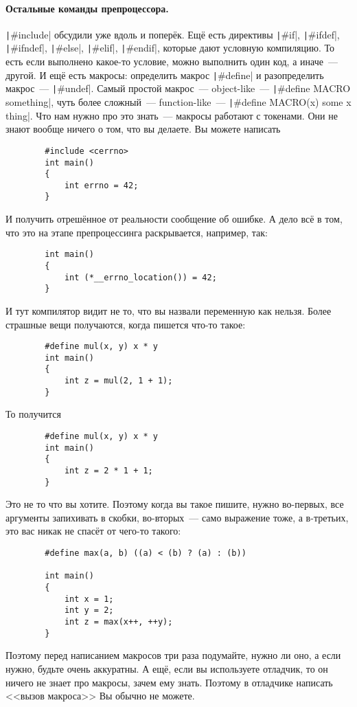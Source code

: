 \documentclass{article}
\begin{document}
    \paragraph{Остальные команды препроцессора.}
    \texttt|#include| обсудили уже вдоль и поперёк. Ещё есть директивы \texttt|#if|, \texttt|#ifdef|, \texttt|#ifndef|, \texttt|#else|, \texttt|#elif|, \texttt|#endif|, которые дают условную компиляцию. То есть если выполнено какое-то условие, можно выполнить один код, а иначе~--- другой. И ещё есть макросы: определить макрос \texttt|#define| и разопределить макрос~--- \texttt|#undef|. Самый простой макрос~--- object-like~--- \texttt|#define MACRO something|, чуть более сложный~--- function-like~--- \texttt|#define MACRO(x) some x thing|. Что нам нужно про это знать~--- макросы работают с токенами. Они не знают вообще ничего о том, что вы делаете. Вы можете написать
    \begin{verbatim}
        #include <cerrno>
        int main()
        {
            int errno = 42;
        }
    \end{verbatim}
    И получить отрешённое от реальности сообщение об ошибке. А дело всё в том, что это на этапе препроцессинга раскрывается, например, так:
    \begin{verbatim}
        int main()
        {
            int (*__errno_location()) = 42;
        }
    \end{verbatim}
    И тут компилятор видит не то, что вы назвали переменную как нельзя. Более страшные вещи получаются, когда пишется что-то такое:
    \begin{verbatim}
        #define mul(x, y) x * y
        int main()
        {
            int z = mul(2, 1 + 1);
        }
    \end{verbatim}
    То получится
    \begin{verbatim}
        #define mul(x, y) x * y
        int main()
        {
            int z = 2 * 1 + 1;
        }
    \end{verbatim}
    Это не то что вы хотите. Поэтому когда вы такое пишите, нужно во-первых, все аргументы запихивать в скобки, во-вторых~--- само выражение тоже, а в-третьих, это вас никак не спасёт от чего-то такого:
    \begin{verbatim}
        #define max(a, b) ((a) < (b) ? (a) : (b))

        int main()
        {
            int x = 1;
            int y = 2;
            int z = max(x++, ++y);
        }
    \end{verbatim}
    Поэтому перед написанием макросов три раза подумайте, нужно ли оно, а если нужно, будьте очень аккуратны. А ещё, если вы используете отладчик, то он ничего не знает про макросы, зачем ему знать. Поэтому в отладчике написать <<вызов макроса>> Вы обычно не можете.
\end{document}
